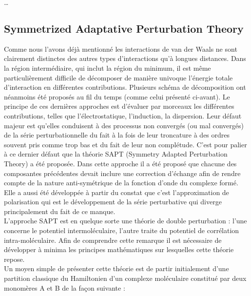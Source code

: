 	\ldots
	
	
	\subsection[SAPT]{Symmetrized Adaptative Perturbation Theory}
	
	
	Comme nous l’avons déjà mentionné les interactions de van der Waals ne sont clairement distinctes des autres types d’interactions qu’à longues distances. Dans la région intermédiaire, qui inclut la région du minimum, il est même particulièrement difficile de décomposer de manière univoque l’énergie totale d’interaction en différentes contributions. Plusieurs schéma de décomposition ont néanmoins été proposés au fil du temps (comme celui présenté ci-avant). Le principe de ces dernières approches est d’évaluer par morceaux les différentes contributions, telles que l’électrostatique, l’induction, la dispersion. Leur défaut majeur est qu’elles conduisent à des processus non convergés (ou mal convergés) de la série perturbationnelle du fait à la fois de leur troncature à des ordres souvent pris comme trop bas  et du fait de leur non complétude. C’est pour palier à ce dernier défaut que la théorie SAPT (Symmetry Adapted Perturbation Theory) a été proposée. Dans cette approche il a été proposé que chacune des composantes précédentes devait inclure une correction d’échange afin de rendre compte de la nature anti-symétrique de la fonction d’onde du complexe formé. Elle a aussi été développée à partir du constat que c’est l’approximation de polarisation qui est le développement de la série perturbative qui diverge principalement du fait de ce manque.\\
	
	L’approche SAPT est en quelque sorte une théorie de double perturbation : l’une concerne le potentiel intermoléculaire, l’autre traite du potentiel de corrélation intra-moléculaire.  Afin de comprendre cette remarque il est nécessaire de développer à minima les principes mathématiques sur lesquelles cette théorie repose.\\
	
	Un moyen simple de présenter cette théorie est de partir initialement d’une partition classique du Hamiltonien d'un complexe moléculaire constitué par deux monomères A et B de la façon suivante :
	
